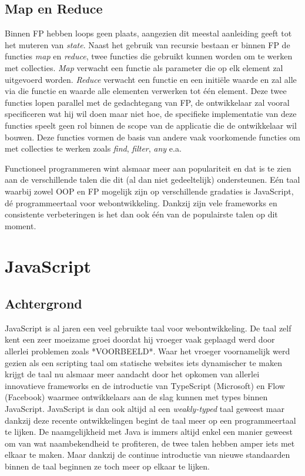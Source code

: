 \subsection{Map en Reduce}
Binnen FP hebben loops geen plaats, aangezien dit meestal aanleiding geeft tot het muteren van \textit{state}. Naast het gebruik van recursie bestaan er binnen FP de functies \textit{map} en \textit{reduce}, twee functies die gebruikt kunnen worden om te werken met collecties. \textit{Map} verwacht een functie als parameter die op elk element zal uitgevoerd worden. \textit{Reduce} verwacht een functie en een initiële waarde en zal alle via die functie en waarde alle elementen verwerken tot één element. Deze twee functies lopen parallel met de gedachtegang van FP, de ontwikkelaar zal vooral specificeren wat hij wil doen maar niet hoe, de specifieke implementatie van deze functies speelt geen rol binnen de scope van de applicatie die de ontwikkelaar wil bouwen. Deze functies vormen de basis van andere vaak voorkomende functies om met collecties te werken zoals \textit{find}, \textit{filter}, \textit{any} e.a.

Functioneel programmeren wint alsmaar meer aan populariteit en dat is te zien aan de verschillende talen die dit (al dan niet gedeeltelijk) ondersteunen. Eén taal waarbij zowel OOP en FP mogelijk zijn op verschillende gradaties is JavaScript, dé programmeertaal voor webontwikkeling. Dankzij zijn vele frameworks en consistente verbeteringen is het dan ook één van de populairste talen op dit moment.

\section{JavaScript}
\subsection{Achtergrond}
JavaScript is al jaren een veel gebruikte taal voor webontwikkeling. De taal zelf kent een zeer moeizame groei doordat hij vroeger vaak geplaagd werd door allerlei problemen zoals *VOORBEELD*. Waar het vroeger voornamelijk werd gezien als een scripting taal om statische websites iets dynamischer te maken krijgt de taal nu alsmaar meer aandacht door het opkomen van allerlei innovatieve frameworks en de introductie van TypeScript (Microsoft) en Flow (Facebook) waarmee ontwikkelaars aan de slag kunnen met types binnen JavaScript. JavaScript is dan ook altijd al een \textit{weakly-typed} taal geweest maar dankzij deze recente ontwikkelingen begint de taal meer op een programmeertaal te lijken. De naamgelijkheid met Java is immers altijd enkel een manier geweest om van wat naambekendheid te profiteren, de twee talen hebben amper iets met elkaar te maken. Maar dankzij de continue introductie van nieuwe standaarden binnen de taal beginnen ze toch meer op elkaar te lijken.

